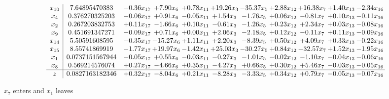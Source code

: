 \documentclass[9pt]{article}
\begin{document}
 \[\begin{array}{c| c c@{\hskip 2pt} c@{\hskip 2pt} c@{\hskip 2pt} c@{\hskip 2pt} c@{\hskip 2pt} c@{\hskip 2pt} c@{\hskip 2pt} c@{\hskip 2pt} c@{\hskip 2pt} }
 x_{10}   &  7.64895470383 & -0.36 x_{17} & +  7.90 x_{6} & +  0.78 x_{11} & + 19.26 x_{3} & -35.37 x_{5} & +  2.88 x_{12} & + 16.38 x_{7} & +  1.40 x_{13} & -2.34 x_{16}\\
 x_{4}   &  0.376270325203 & -0.06 x_{17} & +  0.91 x_{6} & -0.05 x_{11} & +  1.54 x_{3} & -1.76 x_{5} & +  0.06 x_{12} & -0.81 x_{7} & +  0.10 x_{13} & -0.11 x_{16}\\
 x_{2}   &  0.267203832753 & +  0.11 x_{17} & -1.66 x_{6} & +  0.10 x_{11} & -0.61 x_{3} & -1.26 x_{5} & +  0.23 x_{12} & +  2.34 x_{7} & +  0.03 x_{13} & -0.08 x_{16}\\
 x_{9}   &  0.451691347271 & -0.09 x_{17} & +  0.71 x_{6} & +  0.00 x_{11} & +  2.06 x_{3} & -2.18 x_{5} & +  0.12 x_{12} & -0.11 x_{7} & +  0.11 x_{13} & -0.09 x_{16}\\
 x_{14}   &  5.50591608595 & -0.35 x_{17} & -15.27 x_{6} & +  1.11 x_{11} & +  2.20 x_{3} & -8.39 x_{5} & +  0.50 x_{12} & +  4.09 x_{7} & +  0.33 x_{13} & -0.22 x_{16}\\
 x_{15}   &  8.55741869919 & -1.77 x_{17} & + 19.97 x_{6} & -1.42 x_{11} & + 25.03 x_{3} & -30.27 x_{5} & +  0.84 x_{12} & -32.57 x_{7} & +  1.52 x_{13} & -1.95 x_{16}\\
 x_{1}   &  0.0737151567944 & -0.05 x_{17} & +  0.55 x_{6} & -0.03 x_{11} & -0.27 x_{3} & -1.01 x_{5} & -0.02 x_{12} & -1.10 x_{7} & -0.04 x_{13} & -0.06 x_{16}\\
 x_{8}   &  0.569214576074 & +  0.27 x_{17} & -4.66 x_{6} & +  0.35 x_{11} & -4.27 x_{3} & +  0.66 x_{5} & +  0.30 x_{12} & +  5.46 x_{7} & -0.03 x_{13} & -0.05 x_{16}\\
\hline
z    &  0.0827163182346 & +  0.32 x_{17} & -8.04 x_{6} & +  0.21 x_{11} & -8.28 x_{3} & -3.33 x_{5} & +  0.34 x_{12} & +  0.79 x_{7} & -0.05 x_{13} & -0.07 x_{16}\\
\end{array}\]


 $ x_{7} $ enters and $ x_{1} $ leaves 
\end{document}
